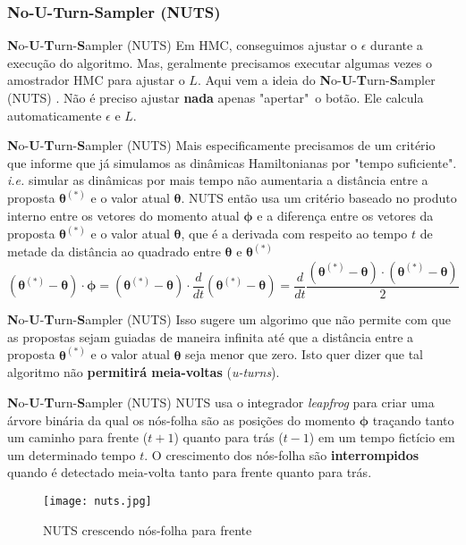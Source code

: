 \subsubsection{No-U-Turn-Sampler (NUTS)}
\begin{frame}{\textbf{N}o-\textbf{U}-\textbf{T}urn-\textbf{S}ampler (NUTS)}
  Em HMC, conseguimos ajustar o $\epsilon$ durante a execução do algoritmo. Mas, geralmente
  precisamos executar algumas vezes o amostrador HMC para ajustar o $L$.
  \vfill
  Aqui vem a ideia do \textbf{N}o-\textbf{U}-\textbf{T}urn-\textbf{S}ampler (NUTS)
  \parencite{hoffman2014no}.
  Não é preciso ajustar \textbf{nada} apenas "apertar"~o botão. Ele calcula automaticamente
  $\epsilon$ e $L$.
\end{frame}

\begin{frame}{\textbf{N}o-\textbf{U}-\textbf{T}urn-\textbf{S}ampler (NUTS)}
  Mais especificamente precisamos de um critério que informe que já simulamos as dinâmicas
  Hamiltonianas por "tempo suficiente". \textit{i.e.} simular as dinâmicas por mais tempo
  não aumentaria a distância entre a proposta $\boldsymbol{\theta}^{(*)}$ e o valor atual
  $\boldsymbol{\theta}$.
  \vfill
  NUTS então usa um critério baseado no produto interno entre os vetores do momento
  atual $\boldsymbol{\phi}$ e a diferença entre os vetores
  da proposta $\boldsymbol{\theta}^{(*)}$ e o valor atual $\boldsymbol{\theta}$,
  que é a derivada com respeito ao tempo $t$ de metade da distância ao quadrado
  entre $\boldsymbol{\theta}$ e $\boldsymbol{\theta}^{(*)}$
  $$
  (\boldsymbol{\theta}^{(*)} - \boldsymbol{\theta}) \cdot \boldsymbol{\phi}
  = (\boldsymbol{\theta}^{(*)} - \boldsymbol{\theta}) \cdot \frac{d}{dt} (\boldsymbol{\theta}^{(*)} - \boldsymbol{\theta})
  = \frac{d}{dt} \frac{(\boldsymbol{\theta}^{(*)} - \boldsymbol{\theta}) \cdot (\boldsymbol{\theta}^{(*)} - \boldsymbol{\theta})}{2}
  $$
\end{frame}

\begin{frame}{\textbf{N}o-\textbf{U}-\textbf{T}urn-\textbf{S}ampler (NUTS)}
  Isso sugere um algorimo que não permite com que as propostas sejam guiadas de maneira
  infinita até que a distância entre a proposta $\boldsymbol{\theta}^{(*)}$ e o valor atual
  $\boldsymbol{\theta}$ seja menor que zero.
  \vfill
  Isto quer dizer que tal algoritmo não \textbf{permitirá meia-voltas} (\textit{u-turns}).
\end{frame}

\begin{frame}{\textbf{N}o-\textbf{U}-\textbf{T}urn-\textbf{S}ampler (NUTS)}
  NUTS usa o integrador \textit{leapfrog} para criar uma árvore binária da qual os nós-folha
  são as posições do momento $\boldsymbol{\phi}$ traçando tanto um caminho para frente
  ($t+1$) quanto para trás ($t-1$) em um tempo fictício em um determinado tempo $t$.
  O crescimento dos nós-folha são \textbf{interrompidos} quando é detectado meia-volta
  tanto para frente quanto para trás.
  \begin{figure}
    \centering
    \texttt{[image: nuts.jpg]}
    \caption{NUTS crescendo nós-folha para frente}
  \end{figure}
\end{frame}

